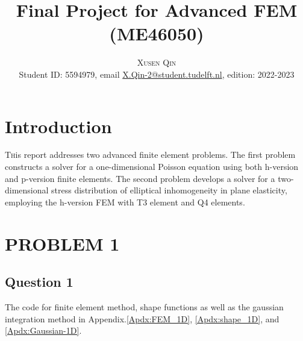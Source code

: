 \documentclass[twoside,twocolumn,10pt]{article}
\title{Final Project for Advanced FEM (ME46050)} %
\author{%
\textsc{Xusen Qin} \\[1ex] %
\normalsize Student ID: 5594979, email \href{X.Qin-2@student.tudelft.nl}{X.Qin-2@student.tudelft.nl}, %
edition: 2022-2023
}
\date{} %
\begin{document}
\maketitle


\section{Introduction}

\lettrine[nindent=0em,lines=3]{T}his report addresses two advanced finite element problems. The first problem constructs a solver for a one-dimensional Poisson equation using both h-version and p-version finite elements. The second problem develops a solver for a two-dimensional stress distribution of elliptical inhomogeneity in plane elasticity, employing the h-version FEM with T3 element and Q4 elements.


\section{\textbf{PROBLEM 1}}
\subsection{Question 1}

The code for finite element method, shape functions as well as the gaussian integration method in Appendix.\ref{Apdx:FEM_1D}, \ref{Apdx:shape_1D}, and \ref{Apdx:Gaussian-1D}.
\end{document}
